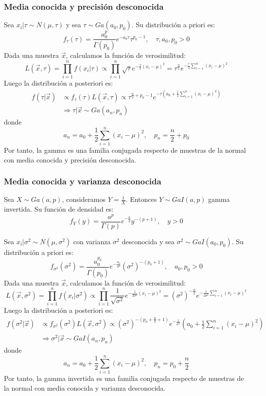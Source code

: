 \subsubsection*{Media conocida y precisión desconocida}
Sea $x_i|\tau \sim N(\mu, \tau)$ y sea $\tau \sim Ga(a_0, p_0)$.
Su distribución a priori es:
$$f_\tau(\tau) = \frac{a_0^p}{\Gamma(p_0)}e^{-a_0\tau}\tau^{p_0-1}, \quad \tau, a_0, p_0 > 0$$
Dada una muestra $\vec{x}$, calculamos la función de verosimilitud:
$$L(\vec{x}, \tau) = \prod_{i=1}^n f(x_i|\tau) \propto \prod_{i=1}^n \sqrt{\tau}e^{-\frac{\tau}{2}(x_i-\mu)^2} = \tau^{\frac{n}{2}}e^{-\frac{\tau}{2}\sum_{i=1}^n(x_i-\mu)^2}$$
Luego la distribución a posteriori es:
\begin{align*}
    f(\tau|\vec{x}) & \propto f_\tau(\tau)L(\vec{x}, \tau) \propto \tau^{\frac{n}{2}+p_0-1}e^{-\tau\left(a_0+\frac{1}{2}\sum_{i=1}^n(x_i-\mu)^2\right)} \\
                    & \Rightarrow \tau|\vec{x} \sim Ga(a_n, p_n)
\end{align*}
donde
$$a_n = a_0 + \frac{1}{2}\sum_{i=1}^n(x_i-\mu)^2, \quad p_n = \frac{n}{2}+p_0$$
Por tanto, la gamma es una familia conjugada respecto de muestras de la normal con media conocida y precisión desconocida.

\subsubsection*{Media conocida y varianza desconocida}
\begin{definition}
    Sea $X \sim Ga(a, p)$, consideramos $Y = \frac{1}{X}$.
    Entonces $Y \sim GaI(a, p)$ gamma invertida.
    Su función de densidad es:
    $$f_Y(y) = \frac{a^p}{\Gamma(p)} e^{-\frac{a}{y}} y^{-(p+1)}, \quad y > 0$$
\end{definition}

Sea $x_i|\sigma^2 \sim N(\mu, \sigma^2)$ con varianza $\sigma^2$ desconocida y sea $\sigma^2 \sim GaI(a_0, p_0)$.
Su distribución a priori es:
$$f_{\sigma^2}(\sigma^2) = \frac{a_0^{p_0}}{\Gamma(p_0)}e^{-\frac{a_0}{\sigma^2}}(\sigma^2)^{-(p_0+1)}, \quad a_0, p_0 > 0$$
Dada una muestra $\vec{x}$, calculamos la función de verosimilitud:
$$L(\vec{x}, \sigma^2) = \prod_{i=1}^n f(x_i|\sigma^2) \propto \prod_{i=1}^n \frac{1}{\sqrt{\sigma^2}}e^{-\frac{1}{2\sigma^2}(x_i-\mu)^2} = (\sigma^2)^{-\frac{n}{2}}e^{-\frac{1}{2\sigma^2}\sum_{i=1}^n(x_i-\mu)^2}$$
Luego la distribución a posteriori es:
\begin{align*}
    f(\sigma^2|\vec{x}) & \propto f_{\sigma^2}(\sigma^2)L(\vec{x}, \sigma^2) \propto (\sigma^2)^{-\left(p_0+\frac{n}{2}+1\right)}e^{-\frac{1}{\sigma^2}}\left(a_0+\frac{1}{2}\sum_{i=1}^n(x_i-\mu)^2\right) \\
                        & \Rightarrow \sigma^2|\vec{x} \sim GaI(a_n, p_n)
\end{align*}
donde
$$a_n = a_0 + \frac{1}{2}\sum_{i=1}^n(x_i-\mu)^2, \quad p_n = p_0 + \frac{n}{2}$$
Por tanto, la gamma invertida es una familia conjugada respecto de muestras de la normal con media conocida y varianza desconocida.

